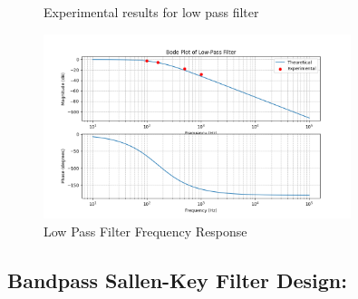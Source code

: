 \documentclass{article}
\begin{document}
\begin{figure}[H]
    \centering
    \hfill
    \caption{Experimental results for low pass filter}
\end{figure}

\begin{figure}[H]
    \centering
    \includegraphics[width=0.8\textwidth]{figs/lowpass.png}
    \caption{Low Pass Filter Frequency Response}
\end{figure}

\subsection{Bandpass Sallen-Key Filter Design:}
\end{document}
